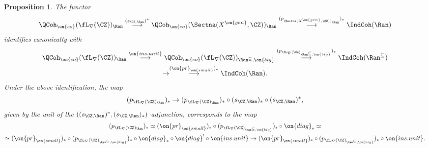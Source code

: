 \documentclass[9pt]{amsart}
\newtheorem{prop}[subsubsection]{Proposition}
\theoremstyle{remark}
\theoremstyle{definition}
\theoremstyle{remark}
\numberwithin{equation}{section}
\begin{document}
\begin{prop}
The functor 
$$\QCoh_{\on{co}}(\fL_\nabla(\CZ))_\Ran \overset{(s_{\CZ,\Ran})^*}\longrightarrow \QCoh_{\on{co}}(\Sectna(X^{\on{gen}},\CZ))_\Ran 
\overset{(p_{\Sectna(X^{\on{gen}},\CZ))_\Ran})_*}\longrightarrow  \IndCoh(\Ran)$$
identifies canonically with
\begin{multline*}
\QCoh_{\on{co}}(\fL_\nabla(\CZ))_\Ran \overset{\on{ins.unit}}\longrightarrow \QCoh_{\on{co}}(\fL_\nabla(\CZ))_{\Ran^{\subseteq},\on{big}}
\overset{(p_{\fL_\nabla(\CZ)_{\Ran^{\subseteq},\on{big}}})_*}\longrightarrow \IndCoh(\Ran^{\subseteq}) \\
\to \overset{(\on{pr}_{\on{small}})_*}\longrightarrow \IndCoh(\Ran).
\end{multline*}
Under the above identification, the map 
$$(p_{\fL_\nabla(\CZ)_\Ran})_*\to (p_{\fL_\nabla(\CZ)_\Ran})_*\circ (s_{\CZ,\Ran})_*\circ (s_{\CZ,\Ran})^*,$$
given by the unit of the $((s_{\CZ,\Ran})^*,(s_{\CZ,\Ran})_*)$-adjunction, corresponds to the map
\begin{multline*}
(p_{\fL_\nabla(\CZ)_\Ran})_*\simeq (\on{pr}_{\on{small}})_* \circ (p_{\fL_\nabla(\CZ)_{\Ran^{\subseteq},\on{big}}})_* \circ \on{diag}_* \simeq \\
\simeq (\on{pr}_{\on{small}})_* \circ (p_{\fL_\nabla(\CZ)_{\Ran^{\subseteq},\on{big}}})_* \circ \on{diag}_*\circ \on{diag}^! \circ \on{ins.unit}
\to (\on{pr}_{\on{small}})_* \circ (p_{\fL_\nabla(\CZ)_{\Ran^{\subseteq},\on{big}}})_* \circ \on{ins.unit}.
\end{multline*}
\end{prop}
\end{document}
